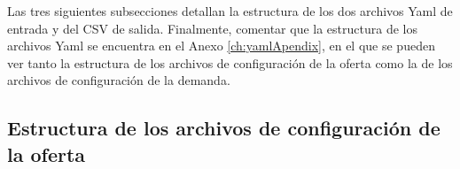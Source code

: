 Las tres siguientes subsecciones detallan la estructura de los dos archivos \acrshort{Yaml} de entrada y del \acrshort{CSV} de salida. Finalmente, comentar que la estructura de los archivos \acrshort{Yaml} se encuentra en el Anexo \ref{ch:yamlApendix}, en el que se pueden ver tanto la estructura de los archivos de configuración de la oferta como la de los archivos de configuración de la demanda. 



\subsection{Estructura de los archivos de configuración de la oferta}\label{sec:EstructuraArchivoOferta}

